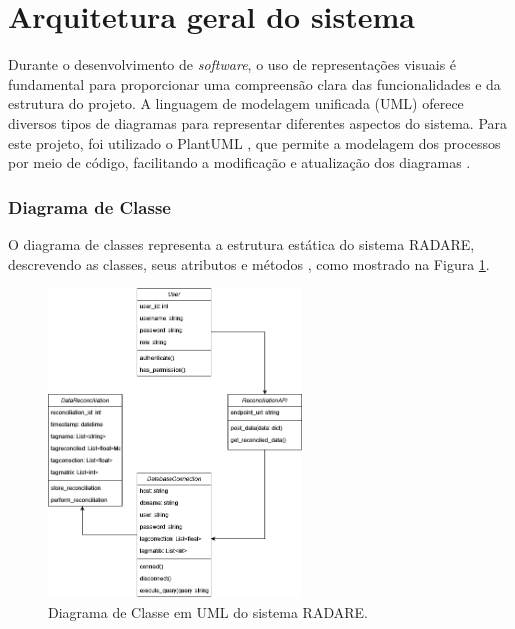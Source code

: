 \section{Arquitetura geral do sistema}

Durante o desenvolvimento de \textit{software}, o uso de representações visuais é fundamental para proporcionar uma compreensão clara das funcionalidades e da estrutura do projeto. A linguagem de modelagem unificada (UML) oferece diversos tipos de diagramas para representar diferentes aspectos do sistema. Para este projeto, foi utilizado o PlantUML \cite{plantumldoc}, que permite a modelagem dos processos por meio de código, facilitando a modificação e atualização dos diagramas \cite{softwareengreq}.

\subsubsection{Diagrama de Classe}

O diagrama de classes representa a estrutura estática do sistema RADARE, descrevendo as classes, seus atributos e métodos \cite{softwareenguml}, como mostrado na Figura \ref{fig:ClassDiagram}.


\begin{figure}[htbp!]
	\centering
        \includegraphics[width=0.6\textwidth]{figuras/ClassDiagramRADARE.drawio.png}
	\caption{Diagrama de Classe em UML do sistema RADARE.}
	\label{fig:ClassDiagram}
\end{figure}

